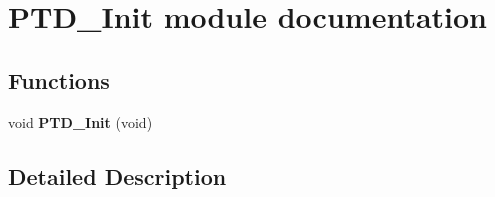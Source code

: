 \hypertarget{group___p_t_d___init__module}{}\section{P\+T\+D\+\_\+\+Init module documentation}
\label{group___p_t_d___init__module}
\subsection*{Functions}
\begin{DoxyCompactItemize}
\item 
void {\bfseries P\+T\+D\+\_\+\+Init} (void)\hypertarget{group___p_t_d___init__module_gab4d96a9d1f03e822699914e2249fe88f}{}\label{group___p_t_d___init__module_gab4d96a9d1f03e822699914e2249fe88f}

\end{DoxyCompactItemize}


\subsection{Detailed Description}
